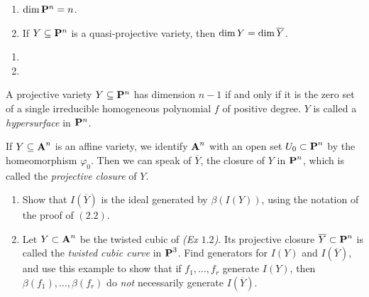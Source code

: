 \documentclass[10pt]{amsart}
\begin{document}
\begin{exercise}[2.7]
    \begin{enumerate}
        \item $\Dim \bbP^n = n$.
        \item If $Y \subseteq \bbP^n$ is a quasi-projective variety, then $\Dim Y =
          \Dim \overline{Y}$.
    \end{enumerate}
\end{exercise}

\begin{solution}
    \begin{enumerate}
        \item {}
        \item 
    \end{enumerate}
\end{solution}

\begin{exercise}[2.8]
    A projective variety $Y \subseteq \bbP^n$ has dimension $n-1$ if
    and only if it is the zero set of a single irreducible homogeneous polynomial
    $f$ of positive degree. $Y$ is called a \emph{hypersurface} in $\bbP^n$.   
\end{exercise}

\begin{solution}
\end{solution}

\begin{exercise}[2.9]
    If $Y \subseteq \aa^n$ is an affine variety, we identify $\aa^n$ with an open
    set $U_0 \subset \pp^n$ by the homeomorphism $\varphi_0$. Then we can speak of
    $\overline{Y}$, the closure of $Y$ in $\pp^n$, which is called the
    \emph{projective closure} of $Y$. 
   \begin{enumerate}
     \item Show that $I(\overline{Y})$ is the ideal generated by $\beta(I(Y))$,
       using the notation of the proof of $(2.2)$. 
     \item Let $Y \subset \aa^n$ be the twisted cubic of \emph{(Ex $1.2$)}. Its
       projective closure $\overline{Y} \subset \pp^n$ is called the \emph{twisted
       cubic curve} in $\pp^3$. Find generators for $I(Y)$ and $I(\overline{Y})$,
       and use this example to show that if $f_1, \ldots, f_r$ generate $I(Y)$,
       then $\beta(f_1), \ldots, \beta(f_r)$ do \emph{not} necessarily generate
       $I(\overline{Y})$. 
   \end{enumerate}
\end{exercise}
\end{document}

